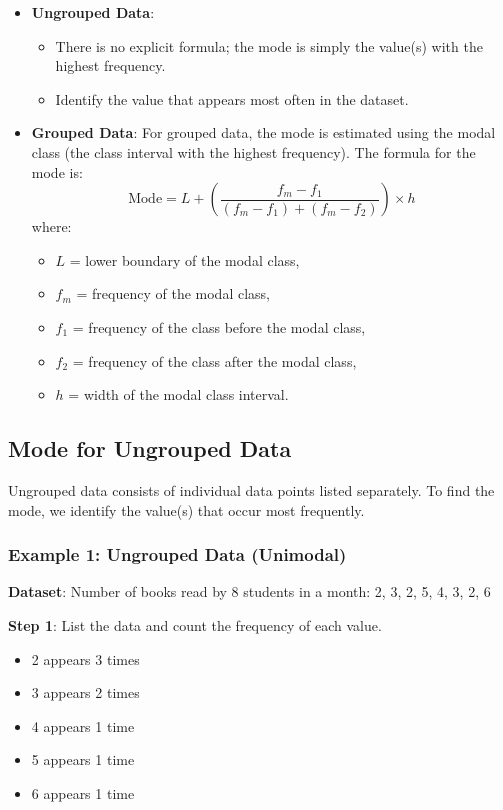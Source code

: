 \documentclass[11pt]{article}
\begin{document}
\begin{itemize}
    \item \textbf{Ungrouped Data}:
    \begin{itemize}
        \item There is no explicit formula; the mode is simply the value(s) with the highest frequency.
        \item Identify the value that appears most often in the dataset.
    \end{itemize}

    \item \textbf{Grouped Data}:
    For grouped data, the mode is estimated using the modal class (the class interval with the highest frequency). The formula for the mode is:
    \[
    \text{Mode} = L + \left( \frac{f_m - f_1}{(f_m - f_1) + (f_m - f_2)} \right) \times h
    \]
    where:
    \begin{itemize}
        \item $L$ = lower boundary of the modal class,
        \item $f_m$ = frequency of the modal class,
        \item $f_1$ = frequency of the class before the modal class,
        \item $f_2$ = frequency of the class after the modal class,
        \item $h$ = width of the modal class interval.
    \end{itemize}
\end{itemize}

\subsection{Mode for Ungrouped Data}

Ungrouped data consists of individual data points listed separately. To find the mode, we identify the value(s) that occur most frequently.

\subsubsection*{Example 1: Ungrouped Data (Unimodal)}
\textbf{Dataset}: Number of books read by 8 students in a month: 2, 3, 2, 5, 4, 3, 2, 6

\textbf{Step 1}: List the data and count the frequency of each value.
\begin{itemize}
    \item 2 appears 3 times
    \item 3 appears 2 times
    \item 4 appears 1 time
    \item 5 appears 1 time
    \item 6 appears 1 time
\end{itemize}
\end{document}
